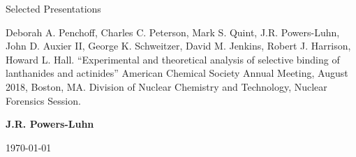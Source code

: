 \documentclass{resume2} %
\begin{document}

\begin{center}
{\Large Selected Presentations}

\item Deborah A. Penchoff, Charles C. Peterson, Mark S. Quint, J.R. Powers-Luhn, John D. Auxier II, George K. Schweitzer, David M. Jenkins, Robert J. Harrison, Howard L. Hall. ``Experimental and theoretical analysis of selective binding of lanthanides and actinides'' American Chemical Society Annual Meeting, August 2018, Boston, MA. Division of Nuclear Chemistry and Technology, Nuclear Forensics Session.

{\large \textbf{J.R. Powers-Luhn}}

\today
\end{center} 

\end{document}
